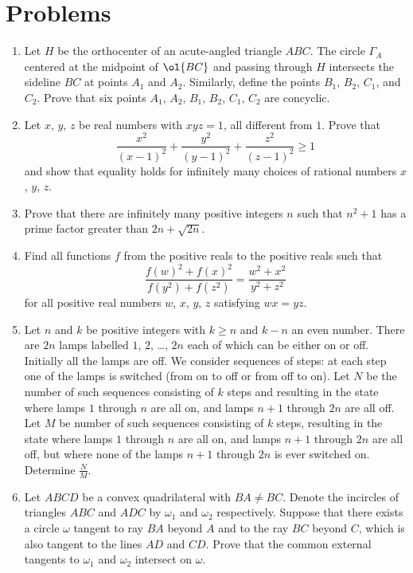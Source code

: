\documentclass[11pt]{scrartcl}
\begin{document}
\section{Problems}
\begin{enumerate}[\bfseries 1.]
\item %
Let $H$ be the orthocenter of an acute-angled triangle $ABC$.
The circle $\Gamma_{A}$ centered at the midpoint of $\ol{BC}$ and passing
through $H$ intersects the sideline $BC$ at points  $A_1$ and $A_2$.
Similarly, define the points $B_1$, $B_2$, $C_1$, and $C_2$.
Prove that six points $A_1$, $A_2$, $B_1$, $B_2$, $C_1$, $C_2$ are concyclic.

\item %
Let $x$, $y$, $z$ be real numbers with $xyz = 1$,
all different from $1$.
Prove that
\[ \frac{x^2}{(x-1)^2} + \frac{y^2}{(y-1)^2}
+ \frac{z^2}{(z-1)^2} \ge 1 \]
and show that equality holds for infinitely many choices
of rational numbers $x$, $y$, $z$.

\item %
Prove that there are infinitely many positive integers $n$
such that $n^2+1$ has a prime factor greater than $2n + \sqrt{2n}$.

\item %
Find all functions $f$ from the positive reals to the positive reals such that
\[ \frac{f(w)^2 + f(x)^2}{f(y^2)+f(z^2)} = \frac{w^2+x^2}{y^2+z^2} \]
for all positive real numbers $w$, $x$, $y$, $z$ satisfying $wx=yz$.

\item %
Let $n$ and $k$ be positive integers
with $k \geq n$ and $k - n$ an even number.
There are $2n$ lamps labelled $1$, $2$, \dots, $2n$
each of which can be either on or off.
Initially all the lamps are off.
We consider sequences of steps:
at each step one of the lamps is switched
(from on to off or from off to on).
Let $N$ be the number of such sequences consisting of $k$ steps
and resulting in the state where lamps $1$ through $n$ are all on,
and lamps $n + 1$ through $2n$ are all off.
Let $M$ be number of such sequences consisting of $k$ steps,
resulting in the state where lamps $1$ through $n$ are all on,
and lamps $n + 1$ through $2n$ are all off,
but where none of the lamps $n + 1$ through $2n$ is ever switched on.
Determine $\frac{N}{M}$.

\item %
Let $ABCD$ be a convex quadrilateral with $BA \neq BC$.
Denote the incircles of triangles $ABC$ and $ADC$
by $\omega_1$ and $\omega_2$ respectively.
Suppose that there exists a circle $\omega$ tangent
to ray $BA$ beyond $A$ and to the ray $BC$ beyond $C$,
which is also tangent to the lines $AD$ and $CD$.
Prove that the common external tangents to
$\omega_1$ and $\omega_2$ intersect on $\omega$.

\end{enumerate}
\pagebreak
\end{document}
